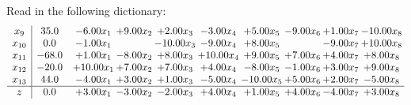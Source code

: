 \documentclass[9pt]{article}
\begin{document}
Read in the following dictionary:
\[\begin{array}{c| c c@{\hskip 2pt} c@{\hskip 2pt} c@{\hskip 2pt} c@{\hskip 2pt} c@{\hskip 2pt} c@{\hskip 2pt} c@{\hskip 2pt} c@{\hskip 2pt} }
 x_{9}   &  35.0 & -6.00 x_{1} & +  9.00 x_{2} & +  2.00 x_{3} & -3.00 x_{4} & +  5.00 x_{5} & -9.00 x_{6} & +  1.00 x_{7} & -10.00 x_{8}\\
 x_{10}   &  0.0 & -1.00 x_{1} &   & -10.00 x_{3} & -9.00 x_{4} & +  8.00 x_{5} &   & -9.00 x_{7} & + 10.00 x_{8}\\
 x_{11}   &  -68.0 & +  1.00 x_{1} & -8.00 x_{2} & +  8.00 x_{3} & + 10.00 x_{4} & +  9.00 x_{5} & +  7.00 x_{6} & +  4.00 x_{7} & +  8.00 x_{8}\\
 x_{12}   &  -20.0 & + 10.00 x_{1} & +  7.00 x_{2} & +  7.00 x_{3} & +  4.00 x_{4} & -8.00 x_{5} & -1.00 x_{6} & +  3.00 x_{7} & +  9.00 x_{8}\\
 x_{13}   &  44.0 & -4.00 x_{1} & +  3.00 x_{2} & +  1.00 x_{3} & -5.00 x_{4} & -10.00 x_{5} & +  5.00 x_{6} & +  2.00 x_{7} & -5.00 x_{8}\\
\hline
z    &  0.0 & +  3.00 x_{1} & -3.00 x_{2} & -2.00 x_{3} & +  4.00 x_{4} & +  1.00 x_{5} & +  4.00 x_{6} & -4.00 x_{7} & +  3.00 x_{8}\\
\end{array}\]
\end{document}
